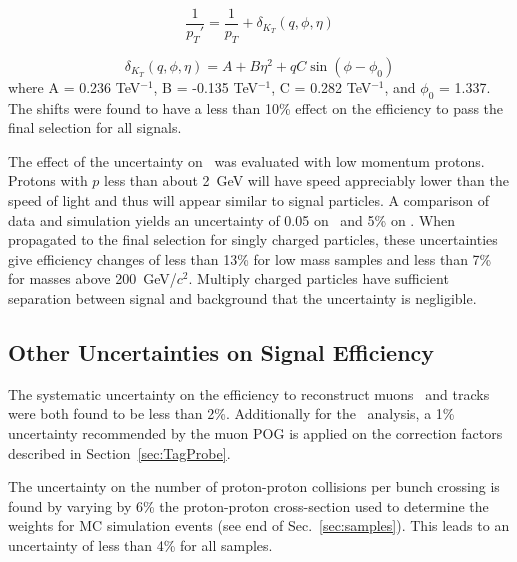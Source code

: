 \begin{equation}
 \frac{1}{p_T\prime} = \frac{1}{p_T} + \delta_{K_T}(q, \phi, \eta)
\end{equation}

\begin{equation}
 \delta_{K_T}(q, \phi, \eta) = A + B\eta^2 + qC\sin(\phi - \phi_0)
\end{equation}
where A = 0.236 TeV$^{-1}$, B = -0.135 TeV$^{-1}$,
C = 0.282 TeV$^{-1}$, and $\phi_0$ = 1.337. The shifts were found to have a less than 10\% effect on the efficiency to pass the final selection for all signals.

The effect of the uncertainty on \dedx\ was evaluated with low momentum protons. Protons with $p$ less than  about 2~GeV will have speed appreciably lower than the
speed of light and thus will appear similar to signal particles. A comparison of data and simulation yields an uncertainty of 0.05 on \ias\ and 5\% on \ih. %
When propagated to the final selection for singly charged particles, these uncertainties give efficiency changes of less than 13\% for low mass samples
and less than 7\% for masses above 200~GeV/$c^2$. Multiply charged particles have sufficient
separation between signal and background that the uncertainty is negligible.


\subsection{Other Uncertainties on Signal Efficiency}

The systematic uncertainty on the efficiency to reconstruct muons~\cite{2012JInst...7P0002T} and tracks~\cite{CMS-PAS-TRK-10-002} were both found to be less than 2\%.
Additionally for the \muononly\ analysis, a 1\% uncertainty recommended by the muon POG is applied on the correction factors described in Section~\ref{sec:TagProbe}.

The uncertainty on the number of proton-proton collisions per bunch crossing is found by varying by 6\% the 
proton-proton cross-section used to determine the weights for MC simulation events (see end of Sec.~\ref{sec:samples}).
This leads to an uncertainty of less than 4\% for all samples.

